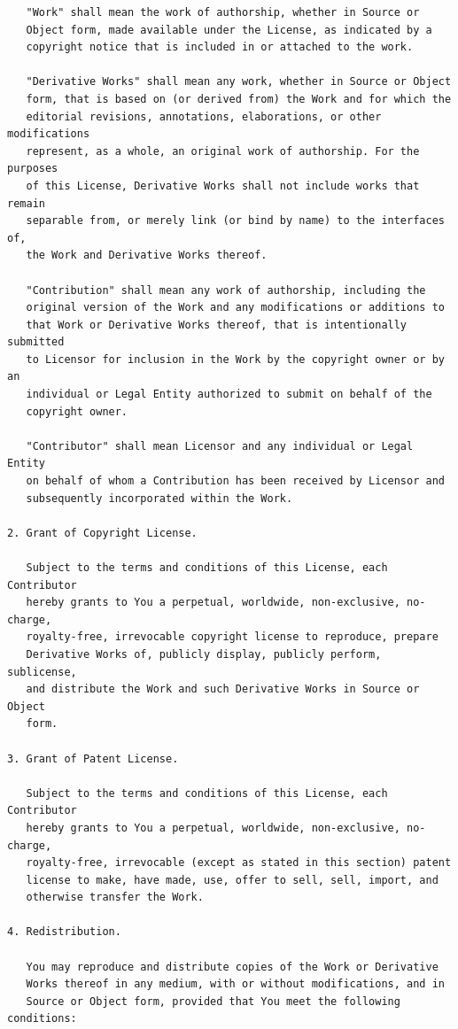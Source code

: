 \documentclass[12pt,a4paper]{article}
\theoremstyle{definition}
\theoremstyle{remark}
\begin{document}
\begin{verbatim}
   "Work" shall mean the work of authorship, whether in Source or
   Object form, made available under the License, as indicated by a
   copyright notice that is included in or attached to the work.

   "Derivative Works" shall mean any work, whether in Source or Object
   form, that is based on (or derived from) the Work and for which the
   editorial revisions, annotations, elaborations, or other modifications
   represent, as a whole, an original work of authorship. For the purposes
   of this License, Derivative Works shall not include works that remain
   separable from, or merely link (or bind by name) to the interfaces of,
   the Work and Derivative Works thereof.

   "Contribution" shall mean any work of authorship, including the
   original version of the Work and any modifications or additions to
   that Work or Derivative Works thereof, that is intentionally submitted
   to Licensor for inclusion in the Work by the copyright owner or by an
   individual or Legal Entity authorized to submit on behalf of the
   copyright owner.

   "Contributor" shall mean Licensor and any individual or Legal Entity
   on behalf of whom a Contribution has been received by Licensor and
   subsequently incorporated within the Work.

2. Grant of Copyright License.

   Subject to the terms and conditions of this License, each Contributor
   hereby grants to You a perpetual, worldwide, non-exclusive, no-charge,
   royalty-free, irrevocable copyright license to reproduce, prepare
   Derivative Works of, publicly display, publicly perform, sublicense,
   and distribute the Work and such Derivative Works in Source or Object
   form.

3. Grant of Patent License.

   Subject to the terms and conditions of this License, each Contributor
   hereby grants to You a perpetual, worldwide, non-exclusive, no-charge,
   royalty-free, irrevocable (except as stated in this section) patent
   license to make, have made, use, offer to sell, sell, import, and
   otherwise transfer the Work.

4. Redistribution.

   You may reproduce and distribute copies of the Work or Derivative
   Works thereof in any medium, with or without modifications, and in
   Source or Object form, provided that You meet the following conditions:


\end{verbatim}
\end{document}
